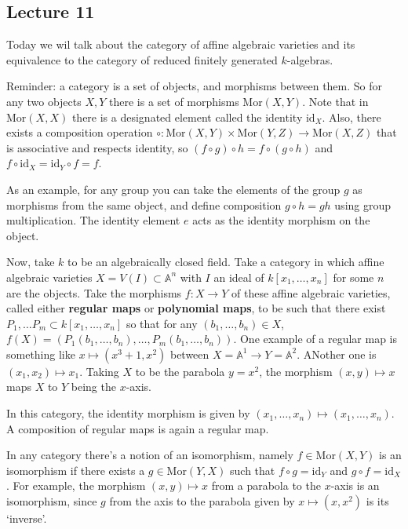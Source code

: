 \documentclass[12pt]{article}
\newcommand{\A}{\mathbb{A}}
\newcommand{\Mor}{\mathrm{Mor}}
\newcommand{\id}{\mathrm{id}}
\begin{document}
    \subsection{Lecture 11}
    Today we wil talk about the category of affine algebraic varieties and its equivalence to the category of reduced finitely generated $k$-algebras. \par 
    Reminder: a category is a set of objects, and morphisms between them. So for any two objects $X, Y$ there is a set of morphisms $\Mor(X, Y)$. Note that in $\Mor(X, X)$ there is a designated element called the identity $\id_X$. Also, there exists a composition operation $\circ: \Mor(X, Y) \times \Mor(Y, Z) \to \Mor(X, Z)$ that is associative and respects identity, so $(f \circ g) \circ h = f \circ(g \circ h)$ and $f \circ \id_X = \id_Y \circ f = f$. \par
    As an example, for any group you can take the elements of the group $g$ as morphisms from the same object, and define composition $g \circ h = gh$ using group multiplication. The identity element $e$ acts as the identity morphism on the object. \par
    Now, take $k$ to be an algebraically closed field. Take a category in which affine algebraic varieties $X = V(I) \subset \A^n$ with $I$ an ideal of $k[x_1,\dots, x_n]$ for some $n$ are the objects. Take the morphisms $f: X \to Y$ of these affine algebraic varieties, called either \textbf{regular maps} or \textbf{polynomial maps}, to be such that there exist $P_1, \dots P_m \subset k[x_1, \dots, x_n]$ so that for any $(b_1, \dots, b_n) \in X$, $f(X) = (P_1(b_1, \dots, b_n), \dots, P_m(b_1, \dots, b_n))$. One example of a regular map is something like $x \mapsto (x^3 + 1, x^2)$ between $X = \A^1 \to Y = \A^2$. ANother one is $(x_1, x_2) \mapsto x_1$. Taking $X$ to be the parabola $y = x^2$, the morphism $(x, y) \mapsto x$ maps $X$ to $Y$ being the $x$-axis. \par 
    In this category, the identity morphism is given by $(x_1, \dots, x_n) \mapsto (x_1, \dots, x_n)$. A composition of regular maps is again a regular map. \par 
    In any category there's a notion of an isomorphism, namely $f \in \Mor(X, Y)$ is an isomorphism if there exists a $g \in \Mor(Y, X)$ such that $f \circ g = \id_Y$ and $g \circ f = \id_X$. For example, the morphism $(x, y) \mapsto x$ from a parabola to the $x$-axis is an isomorphism, since $g$ from the axis to the parabola given by $x \mapsto (x, x^2)$ is its `inverse'. \par 
\end{document}
